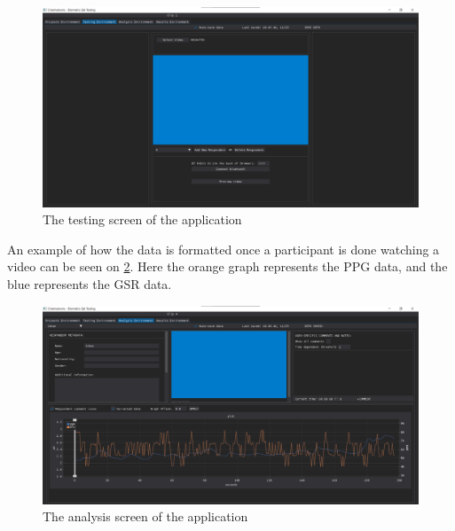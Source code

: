 \begin{figure}[H]
    \centering
    \includegraphics[width=15cm]{pictures/Testing_env.png}
    \caption{The testing screen of the application}
    \label{pic:test-env}
\end{figure}

\noindent An example of how the data is formatted once a participant is done watching a video can be seen on \cref{pic:anal-env}. Here the orange graph represents the PPG data, and the blue represents the GSR data.

\begin{figure}[H]
    \centering
    \includegraphics[width=15cm]{pictures/Analysis_env.png}
    \caption{The analysis screen of the application}
    \label{pic:anal-env}
\end{figure}


